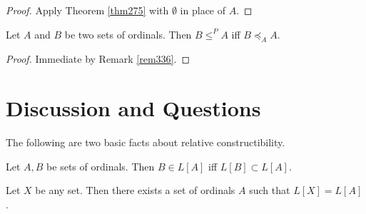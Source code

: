 \documentclass[12pt]{article}
\numberwithin{equation}{section}
\begin{document}
\begin{proof}
Apply Theorem \ref{thm275} with $\emptyset$ in place of $A$. 
\end{proof}

\begin{cor}
Let $A$ and $B$ be two sets of ordinals. Then $B \leq^P A$ iff $B \preceq_A A$.
\end{cor}

\begin{proof}
Immediate by Remark \ref{rem336}.
\end{proof}

\section{Discussion and Questions}

The following are two basic facts about relative constructibility.

\begin{fact}\label{fact276}
Let $A, B$ be sets of ordinals. Then $B \in L[A]$ iff $L[B] \subset L[A]$.
\end{fact}

\begin{fact}\label{fact277}
Let $X$ be any set. Then there exists a set of ordinals $A$ such that $L[X] = L[A]$.
\end{fact}
\end{document}
